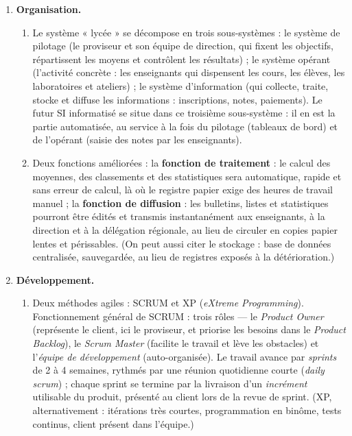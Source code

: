 \documentclass[11pt]{article}
\newcommand{\cle}[1]{{\popxbold\color{popdark}#1}}
\begin{document}
\begin{corrige}
\begin{enumerate}
\begin{enumerate}
    \end{enumerate}
    \item \textbf{Organisation.}
    \begin{enumerate}
        \item Le système « lycée » se décompose en trois sous-systèmes : le \cle{système de pilotage} (le proviseur et son équipe de direction, qui fixent les objectifs, répartissent les moyens et contrôlent les résultats) ; le \cle{système opérant} (l'activité concrète : les enseignants qui dispensent les cours, les élèves, les laboratoires et ateliers) ; le \cle{système d'information} (qui collecte, traite, stocke et diffuse les informations : inscriptions, notes, paiements). Le futur SI informatisé se situe dans ce troisième sous-système : il en est la partie automatisée, au service à la fois du pilotage (tableaux de bord) et de l'opérant (saisie des notes par les enseignants).
        \item Deux fonctions améliorées : la \textbf{fonction de traitement} : le calcul des moyennes, des classements et des statistiques sera automatique, rapide et sans erreur de calcul, là où le registre papier exige des heures de travail manuel ; la \textbf{fonction de diffusion} : les bulletins, listes et statistiques pourront être édités et transmis instantanément aux enseignants, à la direction et à la délégation régionale, au lieu de circuler en copies papier lentes et périssables. (On peut aussi citer le stockage : base de données centralisée, sauvegardée, au lieu de registres exposés à la détérioration.)
    \end{enumerate}
    \item \textbf{Développement.}
    \begin{enumerate}
        \item Deux méthodes agiles : \cle{SCRUM} et \cle{XP} (\emph{eXtreme Programming}). Fonctionnement général de SCRUM : trois rôles — le \emph{Product Owner} (représente le client, ici le proviseur, et priorise les besoins dans le \emph{Product Backlog}), le \emph{Scrum Master} (facilite le travail et lève les obstacles) et l'\emph{équipe de développement} (auto-organisée). Le travail avance par \emph{sprints} de 2 à 4 semaines, rythmés par une réunion quotidienne courte (\emph{daily scrum}) ; chaque sprint se termine par la livraison d'un \emph{incrément} utilisable du produit, présenté au client lors de la revue de sprint. (XP, alternativement : itérations très courtes, programmation en binôme, tests continus, client présent dans l'équipe.)

\end{enumerate}
\end{enumerate}
\end{corrige}
\end{document}
